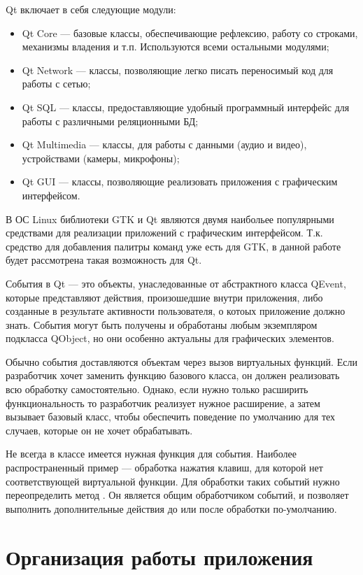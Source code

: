 Qt включает в себя следующие модули:

\begin{itemize}
    \item Qt Core — базовые классы, обеспечивающие рефлексию, работу со
        строками, механизмы владения и т.п. Используются всеми остальными
        модулями;
    \item Qt Network — классы, позволяющие легко писать переносимый код для
        работы с сетью;
    \item Qt SQL — классы, предоставляющие удобный программный интерфейс для
        работы с различными реляционными БД;
    \item Qt Multimedia — классы, для работы с данными (аудио и видео),
        устройствами (камеры, микрофоны);
    \item Qt GUI — классы, позволяющие реализовать приложения с графическим
        интерфейсом.
\end{itemize}

В ОС Linux библиотеки GTK и Qt являются двумя наибольее популярными средствами
для реализации приложений с графическим интерфейсом. Т.к. средство для
добавления палитры команд уже есть для GTK, в данной работе будет рассмотрена
такая возможность для Qt.

События в Qt — это объекты, унаследованные от абстрактного класса QEvent,
которые представляют действия, произошедшие внутри приложения, либо созданные в
результате активности пользователя, о котоых приложение должно знать. События
могут быть получены и обработаны любым экземпляром подкласса QObject, но они
особенно актуальны для графических элементов.

Обычно события доставляются объектам через вызов виртуальных функций. Если
разработчик хочет заменить функцию базового класса, он должен реализовать
всю обработку самостоятельно. Однако, если нужно только расширить
функциональность то разработчик реализует нужное расширение, а затем вызывает
базовый класс, чтобы обеспечить поведение по умолчанию для тех случаев, которые
он не хочет обрабатывать.

Не всегда в классе имеется нужная функция для события. Наиболее распространенный
пример — обработка нажатия клавиш, для которой нет соответствующей виртуальной
функции. Для обработки таких событий нужно переопределить метод
. Он является общим обработчиком событий, и позволяет
выполнить дополнительные действия до или после обработки по-умолчанию.

\section{Организация работы приложения}

